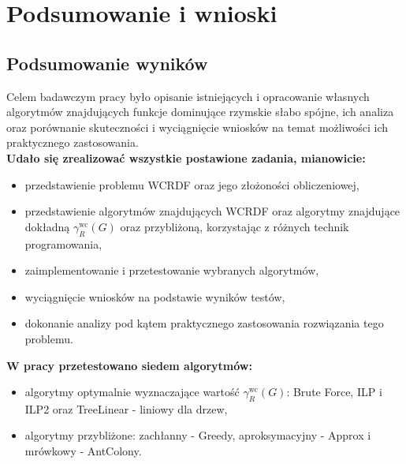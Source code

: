 \chapter{Podsumowanie i wnioski}

\section{Podsumowanie wyników}

Celem badawczym pracy było opisanie istniejących i opracowanie własnych algorytmów znajdujących funkcje dominujące rzymskie słabo spójne, ich analiza oraz porównanie skuteczności i wyciągnięcie wniosków na temat możliwości ich praktycznego zastosowania.\\
\textbf{Udało się zrealizować wszystkie postawione zadania, mianowicie:}
\begin{itemize}
    \item przedstawienie problemu WCRDF oraz jego złożoności obliczeniowej,
    \item przedstawienie algorytmów znajdujących WCRDF oraz algorytmy znajdujące dokładną  $\gamma^{\text{wc}}_R(G)$ oraz przybliżoną, korzystając z różnych technik programowania,
    \item zaimplementowanie i przetestowanie wybranych algorytmów,
    \item wyciągnięcie wniosków na podstawie wyników testów,
    \item dokonanie analizy pod kątem praktycznego zastosowania rozwiązania tego problemu.
\end{itemize}

\textbf{W pracy przetestowano siedem algorytmów:}
\begin{itemize}
    \item algorytmy optymalnie wyznaczające wartość $\gamma^{\text{wc}}_R(G)$: Brute Force, ILP i ILP2 oraz TreeLinear - liniowy dla drzew,
    \item algorytmy przybliżone: zachłanny - Greedy, aproksymacyjny - Approx i mrówkowy - AntColony.
\end{itemize}

